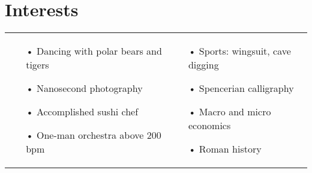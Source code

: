 \documentclass{cv}
\begin{document}
	\section{Interests}
		\begin{tabu} [t] {@{} X[1,l] X[1,l] @{}}
			\begin{itemize}
				\vspace{-0.6\baselineskip} %
				\item[•] Dancing with polar bears and tigers
				\item[•] Nanosecond photography
				\item[•] Accomplished sushi chef
				\item[•] One-man orchestra above 200 bpm
			\end{itemize}
			&
			\begin{itemize} 
				\vspace{-0.6\baselineskip} %
				\item[•] Sports: wingsuit, cave digging
				\item[•] Spencerian calligraphy
				\item[•] Macro and micro economics
				\item[•] Roman history
			\end{itemize}
		\end{tabu}
\end{document}
